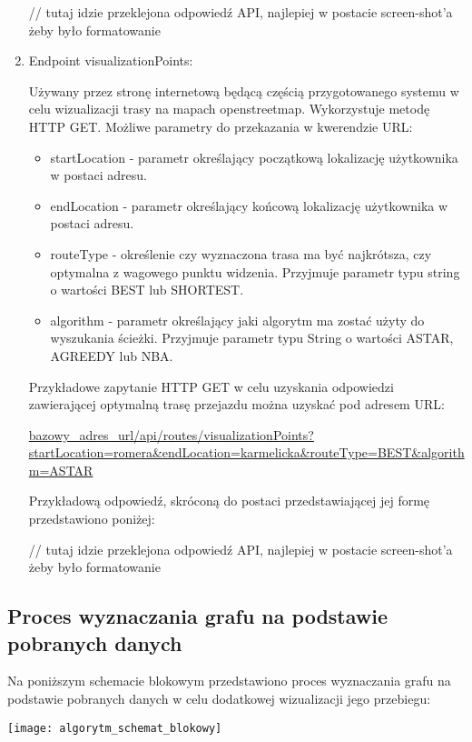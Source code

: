 \begin{enumerate}
// tutaj idzie przeklejona odpowiedź API, najlepiej w postacie screen-shot’a żeby było formatowanie

\item Endpoint visualizationPoints:

Używany przez stronę internetową będącą częścią przygotowanego systemu w celu wizualizacji trasy na mapach openstreetmap. Wykorzystuje metodę HTTP GET. Możliwe parametry do przekazania w kwerendzie URL:

\begin{itemize}
\item startLocation - parametr określający początkową lokalizację użytkownika w postaci adresu.
\item endLocation - parametr określający końcową lokalizację użytkownika w postaci adresu.
\item routeType - określenie czy wyznaczona trasa ma być najkrótsza, czy optymalna z wagowego punktu widzenia. Przyjmuje parametr typu string o wartości BEST lub SHORTEST.
\item algorithm - parametr określający jaki algorytm ma zostać użyty do wyszukania ścieżki. Przyjmuje parametr typu String o wartości ASTAR, AGREEDY lub NBA.
\end{itemize}

Przykładowe zapytanie HTTP GET w celu uzyskania odpowiedzi zawierającej optymalną trasę przejazdu można uzyskać pod adresem URL:

\url{bazowy_adres_url/api/routes/visualizationPoints?startLocation=romera&endLocation=karmelicka&routeType=BEST&algorithm=ASTAR}

Przykładową odpowiedź, skróconą do postaci przedstawiającej jej formę przedstawiono poniżej:

// tutaj idzie przeklejona odpowiedź API, najlepiej w postacie screen-shot’a żeby było formatowanie

\end{enumerate}

\subsection{Proces wyznaczania grafu na podstawie pobranych danych}

Na poniższym schemacie blokowym przedstawiono proces wyznaczania grafu na podstawie pobranych danych w celu dodatkowej wizualizacji jego przebiegu:

\begin{center}
\texttt{[image: algorytm\_schemat\_blokowy]}
\end{center}

